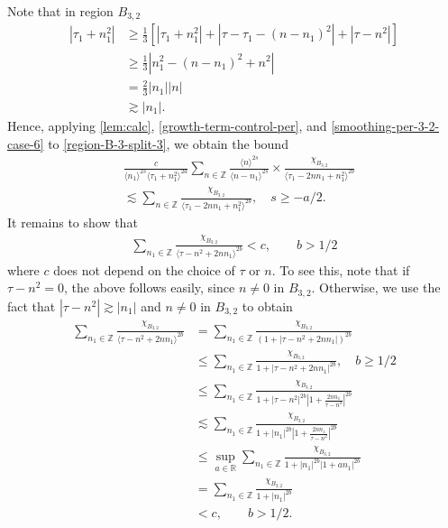 \documentclass[12pt,reqno]{amsart}
\numberwithin{equation}{section}  %
\numberwithin{figure}{section}
\newcommand{\rr}{\mathbb{R}}
\newcommand{\zz}{\mathbb{Z}}
\theoremstyle{plain}
\theoremstyle{definition}
\theoremstyle{remark}
\begin{document}
%
Note that in region $B_{3,2}$
\begin{equation}
  \label{smoothing-per-3-2-case-6}
\begin{split}
  | \tau_{1} + n_{1}^{2} |
  & \ge \frac{1}{3}\left[ | \tau_{1} + n_{1}^{2} | + | \tau -
  \tau_{1} - (n - n_{1})^{2}
  | + | \tau - n^{2} | \right]
  \\
  & \ge \frac{1}{3} |  n_{1}^{2} - (n - n_{1})^{2} + n^{2} |
  \\
  & = \frac{2}{3} | n_{1} | | n |
  \\
  & \gtrsim | n_{1} |.
\end{split}
\end{equation}
%
Hence, applying
\autoref{lem:calc}, \eqref{growth-term-control-per}, and
\eqref{smoothing-per-3-2-case-6} to \eqref{region-B-3-split-3}, we obtain the bound
%
%
\begin{equation*}
  \begin{split}
    &  \frac{c}{\langle n_{1} \rangle ^{2s}
    \langle \tau_{1} + n_{1}^{2} \rangle
    ^{2a}} \sum_{n \in \zz} \frac{\langle n \rangle ^{2s}}{\langle
    n - n_{1}\rangle ^{2s}}  \times \frac{\chi_{B_{3,2}}}{\langle
    \tau_{1} - 2nn_{1} + n_{1}^{2} \rangle ^{2b}} 
    \\
    & \lesssim 
    \sum_{n \in \zz} \frac{\chi_{B_{3,2}}}{\langle
    \tau_{1} - 2nn_{1} + n_{1}^{2} \rangle ^{2b}},
    \quad s \ge -a/2.
  \end{split}
\end{equation*}
%
%
%
It remains to show that 
%
%
%
\begin{equation}
  \label{sum-bound}
\begin{split}
\sum_{n_{1} \in
\zz} \frac{\chi_{B_{3,2}}}{\langle \tau - n^{2} + 2nn_{1}
\rangle ^{2b}} < c, \qquad b > 1/2
\end{split}
\end{equation}
%
%
where $c$ does not depend on the choice of $\tau$ or $n$. 
%
%
To see this, note that if $\tau - n^{2} = 0$, the above follows easily, since
$n \neq 0$ in $B_{3,2}$.
Otherwise, we use the fact that $| \tau - n^{2} | \gtrsim | n_{1} |$ and
$n \neq 0$ in $B_{3,2}$ to obtain 
%
%
\begin{equation*}
\begin{split}
\sum_{n_{1} \in
\zz} \frac{\chi_{B_{3,2}}}{\langle \tau - n^{2} + 2nn_{1}
\rangle ^{2b}}
& = \sum_{n_{1} \in \zz} \frac{\chi_{B_{3,2}}}{(1 + | \tau - n^{2} +
2nn_{1} |)^{2b}}
\\
& \le \sum_{n_{1} \in \zz} \frac{\chi_{B_{3,2}}}{1 + | \tau - n^{2} +
2nn_{1} |^{2b}}, \quad b \ge 1/2
\\
& \le \sum_{n_{1} \in \zz} \frac{\chi_{B_{3,2}}}{1 + | \tau - n^{2}
|^{2b} | 1 + \frac{2nn_{1}}{\tau - n^{2}} |^{2b}}
\\
& \lesssim \sum_{n_{1} \in \zz} \frac{\chi_{B_{3,2}}}{1 + |n_{1}|^{2b}
| 1 + \frac{2nn_{1}}{\tau - n^{2}} |^{2b}}
\\
& \le \sup_{a \in \rr} \sum_{n_{1} \in \zz} \frac{\chi_{B_{3,2}}}{1 + |n_{1}|^{2b}
| 1 + an_{1}|^{2b} }
\\
& = \sum_{n_{1} \in \zz} \frac{\chi_{B_{3,2}}}{1 + |n_{1}|^{2b}}
\\
& < c, \qquad b > 1/2.
\end{split}
\end{equation*}
\end{document}
